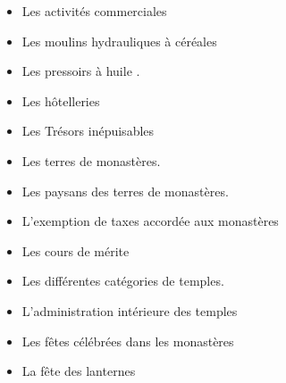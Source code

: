 \begin{itemize}
\begin{itemize}
        \item Les activités commerciales
    \end{itemize}
    \begin{itemize}
        \item Les moulins hydrauliques à céréales
    \end{itemize}
    \begin{itemize}
        \item Les pressoirs à huile .
    \end{itemize}
    \begin{itemize}
        \item Les hôtelleries
    \end{itemize}
    \begin{itemize}
        \item Les Trésors inépuisables
    \end{itemize}
    \begin{itemize}
        \item Les terres de monastères.
    \end{itemize}
    \begin{itemize}
        \item Les paysans des terres de monastères.
    \end{itemize}
    \begin{itemize}
        \item L'exemption de taxes accordée aux monastères
    \end{itemize}
    \begin{itemize}
        \item Les cours de mérite
    \end{itemize}
    \begin{itemize}
        \item Les différentes catégories de temples.
    \end{itemize}
    \begin{itemize}
        \item L'administration intérieure des temples
    \end{itemize}
    \begin{itemize}
        \item Les fêtes célébrées dans les monastères
    \end{itemize}
    \begin{itemize}
        \item La fête des lanternes
    \end{itemize}
    \begin{itemize}

\end{itemize}
\end{itemize}
